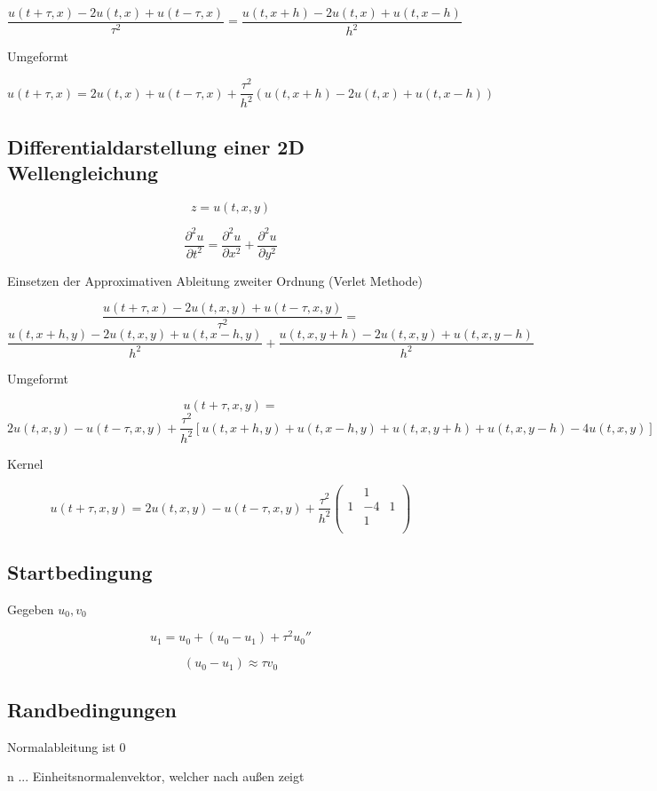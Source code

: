 \documentclass[10pt,a4paper]{article}
\begin{document}
\[ \frac{ u(t+\tau,x) - 2 u(t,x) + u(t-\tau,x) }{\tau^2} = \frac{ u(t,x+h) - 2 u(t,x) + u(t,x-h) }{h^2}  \]

Umgeformt

\[ u(t+\tau,x) = 2 u(t,x) + u(t-\tau,x) + \frac{\tau^2}{h^2}  ( u(t,x+h) - 2 u(t,x) + u(t,x-h) ) \]


\subsection{Differentialdarstellung einer 2D Wellengleichung}

\[ z = u(t, x, y) \]

\[ \frac{\partial^2 u}{\partial t^2} = \frac{\partial^2 u}{\partial x^2} + \frac{\partial^2 u}{\partial y^2} \]

Einsetzen der Approximativen Ableitung zweiter Ordnung (Verlet Methode)

\[ \frac{ u(t+\tau,x) - 2 u(t,x,y) + u(t-\tau,x,y) }{\tau^2} = \]
\[ \frac{ u(t,x+h,y) - 2 u(t,x,y) + u(t,x-h,y) }{h^2} + \frac{ u(t,x,y+h) - 2 u(t,x,y) + u(t,x,y-h) }{h^2}  \]

Umgeformt

\[ u(t+\tau,x,y) = \]
\[  2 u(t,x,y) - u(t-\tau,x,y) + \frac{\tau^2}{h^2}  [ u(t,x+h,y)  + u(t,x-h,y) + u(t,x,y+h) + u(t,x,y-h) - 4u(t,x,y) ] \]

Kernel


\[
u(t+\tau,x,y) = 2 u(t,x,y) - u(t-\tau,x,y) + \frac{\tau^2}{h^2} 
\begin{pmatrix}
  & 1 &  \\
1 & -4 & 1\\
  & 1 & \\
\end{pmatrix}
\]

\subsection{Startbedingung}

Gegeben $ u_0, v_0 $

\[ u_1 = u_0 + (u_0 - u_1) + \tau^2 u_0''  \]

\[ (u_0 - u_1) \approx \tau v_0 \]

\subsection{Randbedingungen}

Normalableitung ist 0 

n ... Einheitsnormalenvektor, welcher nach außen zeigt
\end{document}
